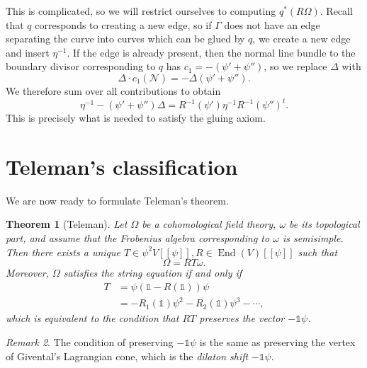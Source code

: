 \documentclass[leqno, openany]{memoir}
\newtheorem{thm}{Theorem}[section]
\theoremstyle{definition}
\theoremstyle{remark}
\newtheorem{rmk}[thm]{Remark}
\theoremstyle{plain}
\theoremstyle{definition}
\theoremstyle{remark}
\newcommand{\mc}[1]{\mathcal{#1}}
\DeclareMathOperator{\End}{End}
\begin{document}
This is complicated, so we will restrict ourselves to computing $q^*(R\Omega)$. Recall that $q$ corresponds to creating a new edge, so if $\Gamma$ does not have an edge separating the curve into curves which can be glued by $q$, we create a new edge and insert $\eta^{-1}$. If the edge is already present, then the normal line bundle to the boundary divisor corresponding to $q$ has $c_1 = -( \psi' + \psi'' )$, so we replace $\Delta$ with
\[ \Delta \cdot c_1(\mc{N}) = -\Delta (\psi' + \psi''). \]
We therefore sum over all contributions to obtain
\[ \eta^{-1} - (\psi' + \psi'') \Delta = R^{-1} (\psi') \eta^{-1} R^{-1}(\psi'')^t. \]
This is precisely what is needed to satisfy the gluing axiom.

\section{Teleman's classification}
\label{sec:teleman}

We are now ready to formulate Teleman's theorem.
\begin{thm}[Teleman]
  Let $\Omega$ be a cohomological field theory, $\omega$ be its topological part, and assume that the Frobenius algebra corresponding to $\omega$ is semisimple. Then there exists a unique $T \in \psi^2 V[[\psi]], R \in \End(V)[[\psi]]$ such that
  \[ \Omega = R T \omega. \]
  Moreover, $\Omega$ satisfies the string equation if and only if
  \begin{align*}
    T &= \psi(\mathbb{1} - R(\mathbb{1}))\psi \\
      &= -R_1(\mathbb{1}) \psi^2 - R_2(\mathbb{1})\psi^3 - \cdots,
  \end{align*}
  which is equivalent to the condition that $RT$ preserves the vector $-\mathbb{1} \psi$.
\end{thm}

\begin{rmk}
The condition of preserving $-\mathbb{1}\psi$ is the same as preserving the vertex of Givental's Lagrangian cone, which is the \textit{dilaton shift} $-\mathbb{1}\psi$.
\end{rmk}
\end{document}
